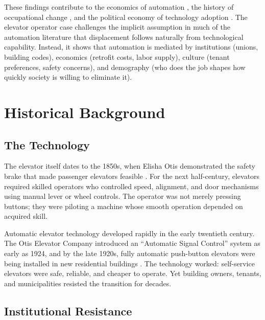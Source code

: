 \documentclass[12pt]{article}
\begin{document}
These findings contribute to the economics of automation \citep{acemoglu2020, autor2003, frey2017}, the history of occupational change \citep{goldinkatz2008, derenoncourt2022}, and the political economy of technology adoption \citep{mokyr1992, david1990}. The elevator operator case challenges the implicit assumption in much of the automation literature that displacement follows naturally from technological capability. Instead, it shows that automation is mediated by institutions (unions, building codes), economics (retrofit costs, labor supply), culture (tenant preferences, safety concerns), and demography (who does the job shapes how quickly society is willing to eliminate it).




\section{Historical Background} \label{sec:background}

\subsection{The Technology}

The elevator itself dates to the 1850s, when Elisha Otis demonstrated the safety brake that made passenger elevators feasible \citep{goodwin2005}. For the next half-century, elevators required skilled operators who controlled speed, alignment, and door mechanisms using manual lever or wheel controls. The operator was not merely pressing buttons; they were piloting a machine whose smooth operation depended on acquired skill.

Automatic elevator technology developed rapidly in the early twentieth century. The Otis Elevator Company introduced an ``Automatic Signal Control'' system as early as 1924, and by the late 1920s, fully automatic push-button elevators were being installed in new residential buildings \citep{goodwin2005}. The technology worked: self-service elevators were safe, reliable, and cheaper to operate. Yet building owners, tenants, and municipalities resisted the transition for decades.

\subsection{Institutional Resistance}
\end{document}
